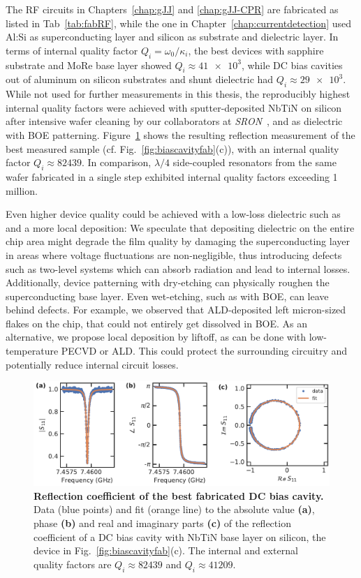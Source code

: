 The RF circuits in Chapters~\ref{chap:gJJ} and \ref{chap:gJJ-CPR} are fabricated as listed in Tab~\ref{tab:fabRF}, while the one in Chapter~\ref{chap:currentdetection} used Al:Si as superconducting layer and silicon as substrate and dielectric layer.
%
In terms of internal quality factor $Q_i=\omega_0/\kappa_i$, the best devices with sapphire substrate and MoRe base layer showed $Q_i\approx\num{41e3}$, while DC bias cavities out of aluminum on silicon substrates and shunt dielectric had $Q_i\approx\num{29e3}$.
%
While not used for further measurements in this thesis, the reproducibly highest internal quality factors were achieved with sputter-deposited NbTiN on silicon after intensive wafer cleaning by our collaborators at \textit{SRON}~\cite{thoenSuperconductingNbTinThin2017}, and  as dielectric with BOE patterning.
%
Figure~\ref{fig:s11NbTiN} shows the resulting reflection measurement of the best measured sample (cf. Fig.~\ref{fig:biascavityfab}(c)), with an internal quality factor $Q_i\approx\num{82439}$.
%
In comparison, $\lambda/4$ side-coupled resonators from the same wafer fabricated in a single step exhibited internal quality factors exceeding 1 million.

Even higher device quality could be achieved with a low-loss dielectric such as  and a more local deposition:
%
We speculate that depositing dielectric on the entire chip area might degrade the film quality by damaging the superconducting layer in areas where voltage fluctuations are non-negligible, thus introducing defects such as two-level systems which can absorb radiation and lead to internal losses.
%
Additionally, device patterning with dry-etching can physically roughen the superconducting base layer.
%
Even wet-etching, such as with BOE, can leave behind defects.
%
For example, we observed that ALD-deposited  left micron-sized flakes on the chip, that could not entirely get dissolved in BOE.
%
As an alternative, we propose local deposition by liftoff, as can be done with low-temperature PECVD or ALD.
%
This could protect the surrounding circuitry and potentially reduce internal circuit losses.

\begin{figure}
	\centering
	\includegraphics[width=\linewidth]{chapter-experimental-methods/figs-fabrication/data_gJJ_ref_Qint}
	\caption{
		\textbf{Reflection coefficient of the best fabricated DC bias cavity.}
		Data (blue points) and fit (orange line) to the absolute value \textbf{(a)}, phase \textbf{(b)} and real and imaginary parts \textbf{(c)} of the reflection coefficient of a DC bias cavity with NbTiN base layer on silicon, the device in Fig.~\ref{fig:biascavityfab}(c).
		The internal and external quality factors are $Q_i\approx\num{82439}$ and $Q_i\approx\num{41209}$.
	}
	\label{fig:s11NbTiN}
\end{figure}